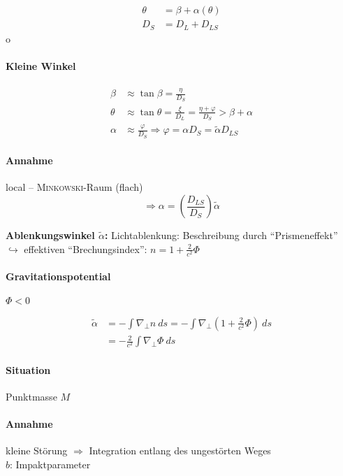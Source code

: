 \begin{align*}
    \theta &= \beta + \alpha (\theta) \\
    D_S &= D_L + D_{LS}
\end{align*}o

\paragraph{Kleine Winkel}
\begin{align*}
    \beta &\approx \tan \beta = \frac{\eta}{D_S} \\
    \theta &\approx \tan \theta = \frac{\xi}{D_L} = \frac{\eta + \varphi}{D_S} > \beta + \alpha \\
    \alpha &\approx \frac{\varphi}{D_S} \Rightarrow \varphi = \alpha D_S = \tilde \alpha D_{LS}
\end{align*}

\paragraph{Annahme} local -- \textsc{Minkowski}-Raum (flach)
\[ \Rightarrow \boxed{\alpha = \left(\frac{D_{LS}}{D_S}\right) \tilde \alpha} \]

\begin{definition}
    \textbf{Ablenkungswinkel $\tilde \alpha$:} Lichtablenkung: Beschreibung durch
    "`Prismeneffekt"' \\
    $\hookrightarrow$ effektiven "`Brechungsindex"': $n = 1 + \frac{2}{c^2} \Phi$
\end{definition}

\paragraph{Gravitationspotential} $\Phi < 0$ 

\begin{align*}
    \tilde \alpha &= -\int \nabla_\bot n\ ds = -\int \nabla_\bot (1 + \frac{2}{c^2} \Phi)\ ds \\
                  &= -\frac{2}{c^2} \int \nabla_\bot \Phi\ ds
\end{align*}

\paragraph{Situation} Punktmasse $M$

\paragraph{Annahme} kleine Störung $\Rightarrow$ Integration entlang des ungestörten Weges \\
$b$: Impaktparameter

